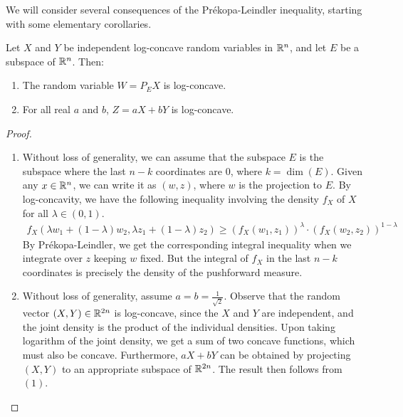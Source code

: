 \documentclass[11pt]{article}
\begin{document}
We will consider several consequences of the Pr\'ekopa-Leindler inequality, starting with some elementary corollaries.
\begin{corollary}
  Let $X$ and $Y$ be independent log-concave random variables in $\mathbb{R}^n$, and let $E$ be a subspace of $\mathbb{R}^n$.
  Then:
  \begin{enumerate}[(1)]
  \item The random variable $W = P_EX$ is log-concave.
  \item For all real $a$ and $b$, $Z = aX + bY$ is log-concave.
  \end{enumerate}
\end{corollary}
\begin{proof}
  \begin{enumerate}[(1)]
  \item Without loss of generality, we can assume that the subspace $E$ is the subspace where the last $n-k$ coordinates are $0$, where $k = \dim(E)$.
    Given any $x \in \mathbb{R}^n$, we can write it as $(w, z)$, where $w$ is the projection to $E$.
    By log-concavity, we have the following inequality involving the density $f_X$ of $X$ for all $\lambda \in (0,1)$.
    \begin{align*}
      f_X(\lambda w_1 + (1-\lambda)w_2, \lambda z_1 + (1-\lambda) z_2)
      \geq \left( f_X(w_1, z_1) \right)^{\lambda} \cdot \left( f_X(w_2, z_2) \right)^{1-\lambda}
    \end{align*}
    By Pr\'ekopa-Leindler, we get the corresponding integral inequality when we integrate over $z$ keeping $w$ fixed.
    But the integral of $f_X$ in the last $n-k$ coordinates is precisely the density of the pushforward measure.
  \item Without loss of generality, assume $a=b=\frac{1}{\sqrt{2}}$.
    Observe that the random vector $(X, Y) \in \mathbb{R}^{2n}$ is log-concave, since the $X$ and $Y$ are independent, and the joint density is the product of the individual densities.
    Upon taking logarithm of the joint density, we get a sum of two concave functions, which must also be concave.
    Furthermore, $aX+bY$ can be obtained by projecting $(X,Y)$ to an appropriate subspace of $\mathbb{R}^{2n}$.
    The result then follows from $(1)$.
  \end{enumerate}
\end{proof}
\end{document}
